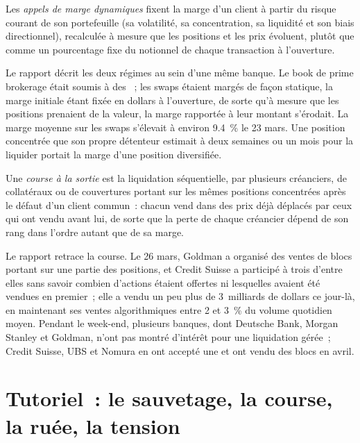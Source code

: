 \begin{definition}\label{def:fm:case-studies-ii:dynamic}
Les \emph{appels de marge dynamiques} fixent la marge d'un client à partir du risque courant de son portefeuille (sa volatilité, sa concentration,
sa liquidité et son biais directionnel), recalculée à mesure que les positions et les prix évoluent, plutôt que comme un pourcentage fixe du notionnel de chaque transaction à l'ouverture.
\end{definition}

Le rapport décrit les deux régimes au sein d'une même banque. Le book de prime brokerage était soumis à des ~; les swaps étaient margés de façon statique, la marge initiale
étant fixée en dollars à l'ouverture, de sorte qu'à mesure que les positions prenaient de la valeur, la marge rapportée à leur montant s'érodait. La marge moyenne sur les swaps s'élevait
à environ 9.4~\% le 23 mars. Une position concentrée que son propre détenteur estimait à deux semaines ou un mois pour la liquider portait la marge
d'une position diversifiée.

\begin{definition}\label{def:fm:case-studies-ii:race}
Une \emph{course à la sortie} est la liquidation séquentielle, par plusieurs créanciers, de collatéraux ou de couvertures portant sur les mêmes positions concentrées
après le défaut d'un client commun~: chacun vend dans des prix déjà déplacés par ceux qui ont vendu avant lui, de sorte que la perte de chaque créancier dépend de son rang dans l'ordre
autant que de sa marge.
\end{definition}

Le rapport retrace la course. Le 26 mars, Goldman a organisé des ventes de blocs portant sur une partie des positions, et Credit Suisse a participé à trois d'entre elles sans savoir
combien d'actions étaient offertes ni lesquelles avaient été vendues en premier~; elle a vendu un peu plus de 3~milliards de dollars ce jour-là, en maintenant ses ventes algorithmiques entre 2 et 3~\% du
volume quotidien moyen. Pendant le week-end, plusieurs banques, dont Deutsche Bank, Morgan Stanley et Goldman, n'ont pas montré d'intérêt pour une
liquidation gérée~; Credit Suisse, UBS et Nomura en ont accepté une et ont vendu des blocs en avril.

\section{Tutoriel~: le sauvetage, la course, la ruée, la tension}\label{tut:fm:case-studies-ii:tut}

